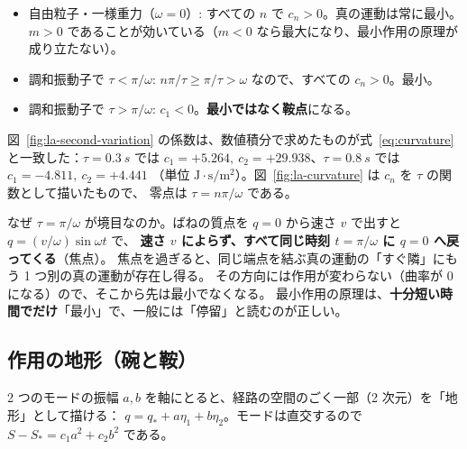 \begin{itemize}
  \item 自由粒子・一様重力（$\omega=0$）: すべての $n$ で $c_n>0$。真の運動は常に最小。
    $m>0$ であることが効いている（$m<0$ なら最大になり、最小作用の原理が成り立たない）。
  \item 調和振動子で $\tau<\pi/\omega$: $n\pi/\tau\ge\pi/\tau>\omega$ なので、すべての $c_n>0$。最小。
  \item 調和振動子で $\tau>\pi/\omega$: $c_1<0$。\textbf{最小ではなく鞍点}になる。
\end{itemize}


図~\ref{fig:la-second-variation} の係数は、数値積分で求めたものが式~\eqref{eq:curvature} と一致した：$\tau=\qty{0.3}{s}$ では
$c_1=+5.264,\ c_2=+29.938$、$\tau=\qty{0.8}{s}$ では $c_1=-4.811,\ c_2=+4.441$
（単位 $\mathrm{J{\cdot}s/m^2}$）。図~\ref{fig:la-curvature} は $c_n$ を $\tau$ の関数として描いたもので、
零点は $\tau=n\pi/\omega$ である。


\begin{intuition}
なぜ $\tau=\pi/\omega$ が境目なのか。ばねの質点を $q=0$ から速さ $v$ で出すと $q=(v/\omega)\sin\omega t$ で、
\textbf{速さ $v$ によらず、すべて同じ時刻 $t=\pi/\omega$ に $q=0$ へ戻ってくる}（焦点）。
焦点を過ぎると、同じ端点を結ぶ真の運動の「すぐ隣」にもう 1 つ別の真の運動が存在し得る。
その方向には作用が変わらない（曲率が 0 になる）ので、そこから先は最小でなくなる。
最小作用の原理は、\textbf{十分短い時間でだけ}「最小」で、一般には「停留」と読むのが正しい。
\end{intuition}

\subsection{作用の地形（碗と鞍）}\label{sec:landscape}

2 つのモードの振幅 $a,b$ を軸にとると、経路の空間のごく一部（2 次元）を「地形」として描ける：
$q=q_*+a\eta_1+b\eta_2$。モードは直交するので $S-S_*=c_1a^2+c_2b^2$ である。

